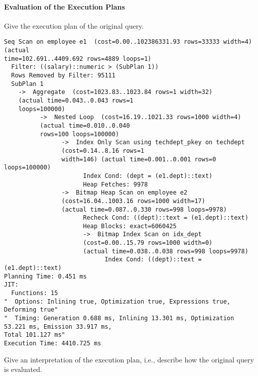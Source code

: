 \documentclass[11pt]{scrartcl}
\begin{document}
    \paragraph{Evaluation of the Execution Plans}

    Give the execution plan of the original query.

            {\small
    \parskip0pt\begin{verbatim}
Seq Scan on employee e1  (cost=0.00..102386331.93 rows=33333 width=4) (actual 
time=102.691..4409.692 rows=4889 loops=1)
  Filter: ((salary)::numeric > (SubPlan 1))
  Rows Removed by Filter: 95111
  SubPlan 1
    ->  Aggregate  (cost=1023.83..1023.84 rows=1 width=32)
    (actual time=0.043..0.043 rows=1
    loops=100000)
          ->  Nested Loop  (cost=16.19..1021.33 rows=1000 width=4)
          (actual time=0.010..0.040
          rows=100 loops=100000)
                ->  Index Only Scan using techdept_pkey on techdept
                (cost=0.14..8.16 rows=1
                width=146) (actual time=0.001..0.001 rows=0 loops=100000)
                      Index Cond: (dept = (e1.dept)::text)
                      Heap Fetches: 9978
                ->  Bitmap Heap Scan on employee e2
                (cost=16.04..1003.16 rows=1000 width=17)
                (actual time=0.087..0.330 rows=998 loops=9978)
                      Recheck Cond: ((dept)::text = (e1.dept)::text)
                      Heap Blocks: exact=6060425
                      ->  Bitmap Index Scan on idx_dept
                      (cost=0.00..15.79 rows=1000 width=0)
                      (actual time=0.038..0.038 rows=998 loops=9978)
                            Index Cond: ((dept)::text = (e1.dept)::text)
Planning Time: 0.451 ms
JIT:
  Functions: 15
"  Options: Inlining true, Optimization true, Expressions true, Deforming true"
"  Timing: Generation 0.688 ms, Inlining 13.301 ms, Optimization 53.221 ms, Emission 33.917 ms, 
Total 101.127 ms"
Execution Time: 4410.725 ms
    \end{verbatim}}

    Give an interpretation of the execution plan, i.e., describe how the original query is evaluated.
\end{document}
